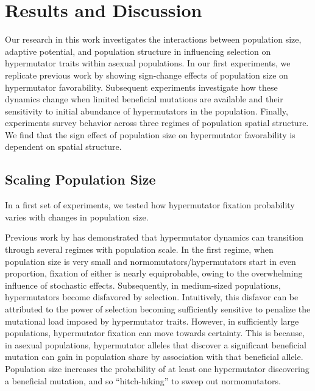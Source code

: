 \section{Results and Discussion} \label{sec:results}

Our research in this work investigates the interactions between population size, adaptive potential, and population structure in influencing selection on hypermutator traits within asexual populations.
In our first experiments, we replicate previous work by \citet{raynes2018sign} showing sign-change effects of population size on hypermutator favorability.
Subsequent experiments investigate how these dynamics change when limited beneficial mutations are available and their sensitivity to initial abundance of hypermutators in the population.
Finally, experiments survey behavior across three regimes of population spatial structure.
We find that the sign effect of population size on hypermutator favorability is dependent on spatial structure.

\subsection{Scaling Population Size}
\label{sec:scaling-population-size}

In a first set of experiments, we tested how hypermutator fixation probability varies with changes in population size.

Previous work by \citet{raynes2018sign} has demonstrated that hypermutator dynamics can transition through several regimes with population scale.
In the first regime, when population size is very small and normomutators/hypermutators start in even proportion, fixation of either is nearly equiprobable, owing to the overwhelming influence of stochastic effects.
Subsequently, in medium-sized populations, hypermutators become disfavored by selection.
Intuitively, this disfavor can be attributed to the power of selection becoming sufficiently sensitive to penalize the mutational load imposed by hypermutator traits.
However, in sufficiently large populations, hypermutator fixation can move towards certainty.
This is because, in asexual populations, hypermutator alleles that discover a significant beneficial mutation can gain in population share by association with that beneficial allele.
Population size increases the probability of at least one hypermutator discovering a beneficial mutation, and so ``hitch-hiking'' to sweep out normomutators.



